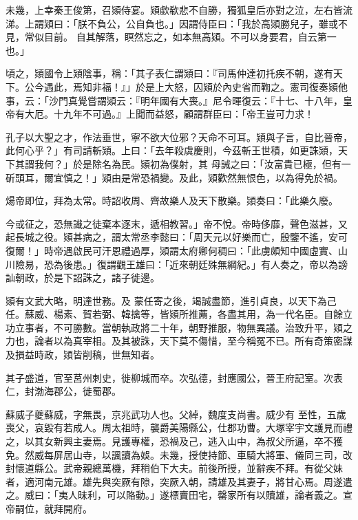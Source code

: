 \begin{pinyinscope}
 未幾，上幸秦王俊第，召熲侍宴。熲歔欷悲不自勝，獨狐皇后亦對之泣，左右皆流涕。上謂熲曰：「朕不負公，公自負也。」因謂侍臣曰：「我於高熲勝兒子，雖或不見，常似目前。
 自其解落，瞑然忘之，如本無高熲。不可以身要君，自云第一也。」



 頃之，熲國令上熲陰事，稱：「其子表仁謂熲曰：『司馬仲達初托疾不朝，遂有天下。公今遇此，焉知非福！』」於是上大怒，囚熲於內史省而鞫之。憲司復奏熲他事，云：「沙門真覺嘗謂熲云：『明年國有大喪。』尼令暉復云：『十七、十八年，皇帝有大厄。十九年不可過。』上聞而益怒，顧謂群臣曰：「帝王豈可力求！



 孔子以大聖之才，作法垂世，寧不欲大位邪？天命不可耳。熲與子言，自比晉帝，此何心乎？」有司請斬熲。上曰：「去年殺虞慶則，今茲斬王世積，如更誅熲，天下其謂我何？」於是除名為民。熲初為僕射，其
 母誡之曰：「汝富貴已極，但有一斫頭耳，爾宜慎之！」熲由是常恐禍變。及此，熲歡然無恨色，以為得免於禍。



 煬帝即位，拜為太常。時詔收周、齊故樂人及天下散樂。熲奏曰：「此樂久廢。



 今或征之，恐無識之徒棄本逐末，遞相教習。」帝不悅。帝時侈靡，聲色滋甚，又起長城之役。熲甚病之，謂太常丞李懿曰：「周天元以好樂而亡，殷鑒不遙，安可復爾！」時帝遇啟民可汗恩禮過厚，熲謂太府卿何稠曰：「此虜頗知中國虛實、山川險易，恐為後患。」復謂觀王雄曰：「近來朝廷殊無綱紀。」有人奏之，帝以為謗訕朝政，於是下詔誅之，諸子徙邊。



 熲有文武大略，明達世務。及
 蒙任寄之後，竭誠盡節，進引貞良，以天下為己任。蘇威、楊素、賀若弼、韓擒等，皆熲所推薦，各盡其用，為一代名臣。自餘立功立事者，不可勝數。當朝執政將二十年，朝野推服，物無異議。治致升平，熲之力也，論者以為真宰相。及其被誅，天下莫不傷惜，至今稱冤不已。所有奇策密謀及損益時政，熲皆削稿，世無知者。



 其子盛道，官至莒州刺史，徙柳城而卒。次弘德，封應國公，晉王府記室。次表仁，封渤海郡公，徙蜀郡。



 蘇威子夔蘇威，字無畏，京兆武功人也。父綽，魏度支尚書。威少有
 至性，五歲喪父，哀毀有若成人。周太祖時，襲爵美陽縣公，仕郡功曹。大塚宰宇文護見而禮之，以其女新興主妻焉。見護專權，恐禍及己，逃入山中，為叔父所逼，卒不獲免。然威每屏居山寺，以諷讀為娛。未幾，授使持節、車騎大將軍、儀同三司，改封懷道縣公。武帝親總萬機，拜稍伯下大夫。前後所授，並辭疾不拜。有從父妹者，適河南元雄。雄先與突厥有隙，突厥入朝，請雄及其妻子，將甘心焉。周遂遣之。威曰：「夷人昧利，可以賂動。」遂標賣田宅，罄家所有以贖雄，論者義之。宣帝嗣位，就拜開府。




\end{pinyinscope}
